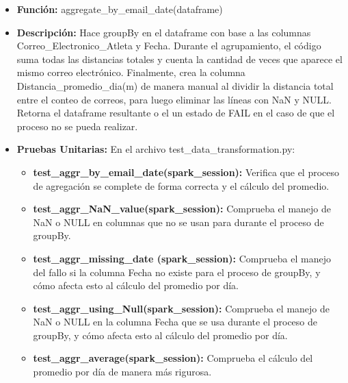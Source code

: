 \documentclass[a4paper]{article}
\begin{document}
\begin{itemize}
        \begin{itemize}
            \item \textbf{Funci\'{o}n:} aggregate\_by\_email\_date(dataframe)
            \item \textbf{Descripci\'{o}n:} Hace groupBy en el dataframe con base a las columnas Correo\_Electronico\_Atleta y Fecha. Durante el agrupamiento, el c\'{o}digo suma todas las distancias totales y cuenta la cantidad de veces que aparece el mismo correo electr\'{o}nico. Finalmente, crea la columna Distancia\_promedio\_dia(m) de manera manual al dividir la distancia total entre el conteo de correos, para  luego eliminar las l\'{i}neas con NaN y NULL. Retorna el dataframe resultante o el un estado de FAIL en el caso de que el proceso no se pueda realizar.
            \item \textbf{Pruebas Unitarias:} En el archivo test\_data\_transformation.py:
                \begin{itemize}
                    \item \textbf{test\_aggr\_by\_email\_date(spark\_session):} Verifica que el proceso de agregaci\'{o}n se complete de forma correcta y el c\'{a}lculo del promedio.
                    \item \textbf{test\_aggr\_NaN\_value(spark\_session):} Comprueba el manejo de NaN o NULL en columnas que no se usan para durante el proceso de groupBy.
                    \item \textbf{test\_aggr\_missing\_date (spark\_session):} Comprueba el manejo del fallo si la columna Fecha no existe para el proceso de groupBy, y c\'{o}mo afecta esto al c\'{a}lculo del promedio por d\'{i}a.
                    \item \textbf{test\_aggr\_using\_Null(spark\_session):} Comprueba el manejo de NaN o NULL en la columna Fecha que se usa durante el proceso de groupBy, y c\'{o}mo afecta esto al c\'{a}lculo del promedio por d\'{i}a.
                     \item \textbf{test\_aggr\_average(spark\_session):} Comprueba el c\'{a}lculo del promedio por d\'{i}a de manera m\'{a}s rigurosa.
                \end{itemize}
        \end{itemize}


\end{itemize}
\end{document}
